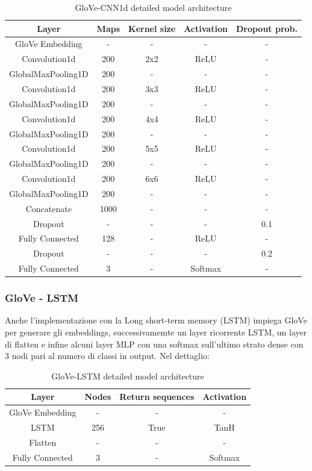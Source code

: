 \begin{table}[!ht]
\centering
\caption{GloVe-CNN1d detailed model architecture}
\label{tab:cnn}
\begin{tabular}{ccccc}
\toprule
Layer & Maps & Kernel size & Activation & Dropout prob.\\
\midrule
    GloVe Embedding & - & - & - & - \\
    Convolution1d & 200 & 2x2 & ReLU & -\\
    GlobalMaxPooling1D & 200 & - & - & -\\
    Convolution1d & 200 & 3x3 & ReLU & -\\
    GlobalMaxPooling1D & 200 & - & - & -\\
    Convolution1d & 200 & 4x4 & ReLU & -\\
    GlobalMaxPooling1D & 200 & - & - & -\\
    Convolution1d & 200 & 5x5 & ReLU & -\\
    GlobalMaxPooling1D & 200 & - & - & -\\
    Convolution1d & 200 & 6x6 & ReLU & -\\
    GlobalMaxPooling1D & 200 & - & - & -\\
    Concatenate & 1000 & - & - & -\\
    Dropout & - & - & - & 0.1\\
    Fully Connected & 128 & - & ReLU & -\\
    Dropout & - & - & - & 0.2\\
    Fully Connected & 3 & - & Softmax & -\\
\bottomrule
\end{tabular}
\end{table}
\newpage

  \subsubsection{GloVe - LSTM}
  Anche l'implementazione con la Long short-term memory (LSTM) impiega GloVe per generare gli embeddings, successivamemte un layer ricorrente LSTM, un layer di flatten e infine alcuni layer MLP con una softmax sull'ultimo strato dense con 3 nodi pari al numero di classi in output. Nel dettaglio:
\begin{table}[!ht]
\centering
\caption{GloVe-LSTM detailed model architecture}
\begin{tabular}{cccc}
\toprule
Layer & Nodes & Return sequences & Activation \\
\midrule
    GloVe Embedding & - & - & - \\
    LSTM & 256 & True & TanH \\
    Flatten & - & - & - \\
    Fully Connected & 3 & - & Softmax\\
\bottomrule
\end{tabular}
\end{table}
  
